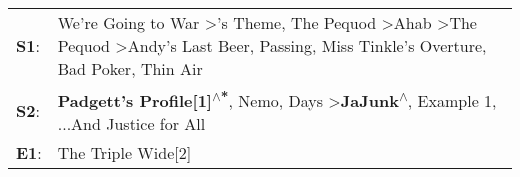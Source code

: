 \begin{supertabular}{p{0.03\textwidth}p{0.92\textwidth}}
 \textbf{S1}:  &  We're Going to War\textsuperscript{} \textgreater {}'s Theme\textsuperscript{}, \enspace The Pequod\textsuperscript{} \textgreater \enspace Ahab\textsuperscript{} \textgreater \enspace The Pequod\textsuperscript{} \textgreater \enspace Andy's Last Beer\textsuperscript{}, \enspace Passing\textsuperscript{}, \enspace Miss Tinkle's Overture\textsuperscript{}, \enspace Bad Poker\textsuperscript{}, \enspace Thin Air\textsuperscript{}  \enspace  \\
 \textbf{S2}:  &                                                                                                                                                                     \textbf{Padgett's Profile[1]\textsuperscript{$\wedge$*}}, \enspace Nemo\textsuperscript{},  Days\textsuperscript{} \textgreater \enspace \textbf{JaJunk\textsuperscript{$\wedge$}}, \enspace Example 1\textsuperscript{}, \enspace ...And Justice for All\textsuperscript{}  \enspace  \\
 \textbf{E1}:  &                                                                                                                                                                                                                                                                                                                                                                                                                       The Triple Wide[2]\textsuperscript{}  \enspace  \\
\end{supertabular}

